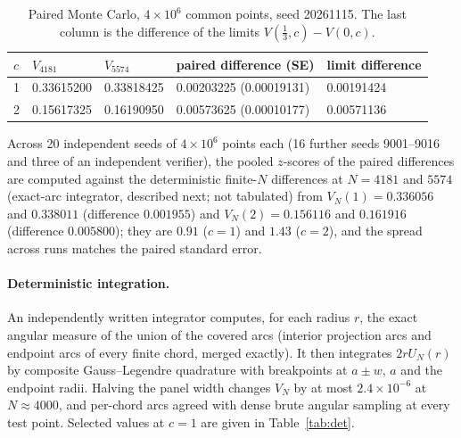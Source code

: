 \documentclass[11pt]{amsart}
\theoremstyle{remark}
\begin{document}
\begin{table}[ht]
\centering
\begin{tabular}{@{}lllll@{}}
\toprule
$c$ & $V_{4181}$ & $V_{5574}$ & paired difference (SE) & limit difference\\
\midrule
1 & 0.33615200 & 0.33818425 & 0.00203225 (0.00019131) & 0.00191424\\
2 & 0.15617325 & 0.16190950 & 0.00573625 (0.00010177) & 0.00571136\\
\bottomrule
\end{tabular}
\caption{Paired Monte Carlo, $4\times10^6$ common points, seed 20261115. The last column is the difference of the limits $V(\tfrac13,c)-V(0,c)$.}\label{tab:mc}
\end{table}

Across 20 independent seeds of $4\times10^6$ points each (16 further seeds 9001--9016 and three of an independent
verifier), the pooled $z$-scores of the paired differences are computed against the deterministic
finite-$N$ differences at $N=4181$ and $5574$ (exact-arc integrator, described next; not
tabulated) from $V_N(1)=0.336056$ and $0.338011$ (difference $0.001955$) and
$V_N(2)=0.156116$ and $0.161916$ (difference $0.005800$); they are $0.91$ ($c=1$) and
$1.43$ ($c=2$), and the spread across runs
matches the paired standard error.

\paragraph{Deterministic integration.} An independently written integrator computes, for
each radius $r$, the exact angular measure of the union of the covered arcs (interior
projection arcs and endpoint arcs of every finite chord, merged exactly). It then
integrates $2rU_N(r)$ by composite Gauss--Legendre quadrature with breakpoints at $a\pm w$,
$a$ and the endpoint radii. Halving the panel width changes $V_N$ by at most
$2.4\times10^{-6}$ at $N\approx4000$, and per-chord arcs agreed with dense brute angular
sampling at every test point. Selected values at $c=1$ are given in Table~\ref{tab:det}.
\end{document}
